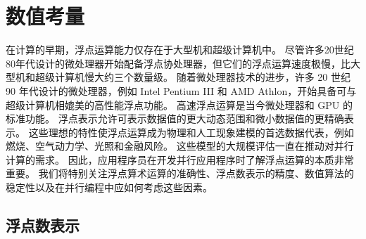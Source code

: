 \section{数值考量}
在计算的早期，浮点运算能力仅存在于大型机和超级计算机中。 尽管许多20世纪80年代设计的微处理器开始配备浮点协处理器，但它们的浮点运算速度极慢，比大型机和超级计算机慢大约三个数量级。 随着微处理器技术的进步，许多 20 世纪 90 年代设计的微处理器，例如 Intel Pentium III 和 AMD Athlon，开始具备可与超级计算机相媲美的高性能浮点功能。 高速浮点运算是当今微处理器和 GPU 的标准功能。 浮点表示允许可表示数据值的更大动态范围和微小数据值的更精确表示。 这些理想的特性使浮点运算成为物理和人工现象建模的首选数据代表，例如燃烧、空气动力学、光照和金融风险。 这些模型的大规模评估一直在推动对并行计算的需求。 因此，应用程序员在开发并行应用程序时了解浮点运算的本质非常重要。 我们将特别关注浮点算术运算的准确性、浮点数表示的精度、数值算法的稳定性以及在并行编程中应如何考虑这些因素。

\subsection{浮点数表示}